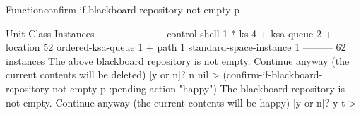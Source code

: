 \documentclass[10pt,twoside,english,pdftex]{article}
\begin{document}
\begin{functiondoc}{Function}{confirm-if-blackboard-repository-not-empty-p}{%
    }
\begin{example}
  Unit Class                            Instances
  ----------                            ---------
  control-shell                                 1 *
  ks                                            4 +
  ksa-queue                                     2 +
  location                                     52  
  ordered-ksa-queue                             1 +
  path                                          1  
  standard-space-instance                       1  
                                        ---------
                                               62 instances
  The above blackboard repository is not empty.
  Continue anyway (the current contents will be deleted) [y or n]? n
  nil
  > (confirm-if-blackboard-repository-not-empty-p :pending-action "happy")
  The blackboard repository is not empty.
  Continue anyway (the current contents will be happy) [y or n]? y
  t
  >
\end{example}

\end{functiondoc}

\end{document}
